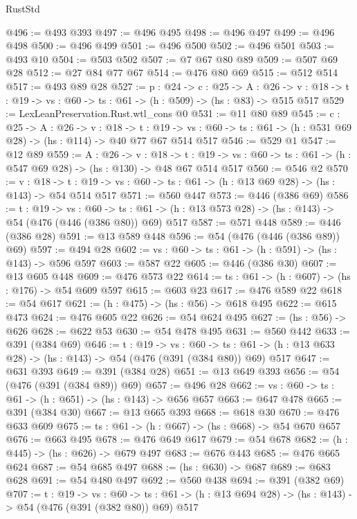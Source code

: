\begin{lexlean}{RustStd}
\begin{coremodule}
@496 := @493 @393
@497 := @496 @495
@498 := @496 @497
@499 := @496 @498
@500 := @496 @499
@501 := @496 @500
@502 := @496 @501
@503 := @493 @10
@504 := @503 @502
@507 := @7 @67 @80 @89
@509 := @507 @69 @28
@512 := @27 @84 @77 @67
@514 := @476 @80 @69
@515 := @512 @514
@517 := @493 @89 @28
@527 := {p : @24} ->
  {c : @25} ->
  {A : @26} ->
  {v : @18} -> {t : @19} -> {vs : @60} -> {ts : @61} -> (h : @509) -> (hs : @83) -> @515 @517
@529 := LexLeanPreservation.Rust.wtl_cons @0
@531 := @11 @80 @89
@545 := {c : @25} ->
  {A : @26} ->
  {v : @18} ->
  {t : @19} ->
  {vs : @60} -> {ts : @61} -> (h : @531 @69 @28) -> (hs : @114) -> @40 @77 @67 @514 @517
@546 := @529 @1
@547 := @12 @89
@559 := {A : @26} ->
  {v : @18} ->
  {t : @19} -> {vs : @60} -> {ts : @61} -> (h : @547 @69 @28) -> (hs : @130) -> @48 @67 @514 @517
@560 := @546 @2
@570 := {v : @18} ->
  {t : @19} -> {vs : @60} -> {ts : @61} -> (h : @13 @69 @28) -> (hs : @143) -> @54 @514 @517
@571 := @560 @447
@573 := @446 (@386 @69)
@586 := {t : @19} ->
  {vs : @60} ->
  {ts : @61} -> (h : @13 @573 @28) -> (hs : @143) -> @54 (@476 (@446 (@386 @80)) @69) @517
@587 := @571 @448
@589 := @446 (@386 @28)
@591 := @13 @589 @448
@596 := @54 (@476 (@446 (@386 @89)) @69)
@597 := @494 @28
@602 := {vs : @60} -> {ts : @61} -> (h : @591) -> (hs : @143) -> @596 @597
@603 := @587 @22
@605 := @446 (@386 @30)
@607 := @13 @605 @448
@609 := @476 @573 @22
@614 := {ts : @61} -> (h : @607) -> (hs : @176) -> @54 @609 @597
@615 := @603 @23
@617 := @476 @589 @22
@618 := @54 @617
@621 := (h : @475) -> (hs : @56) -> @618 @495
@622 := @615 @473
@624 := @476 @605 @22
@626 := @54 @624 @495
@627 := (hs : @56) -> @626
@628 := @622 @53
@630 := @54 @478 @495
@631 := @560 @442
@633 := @391 (@384 @69)
@646 := {t : @19} ->
  {vs : @60} ->
  {ts : @61} -> (h : @13 @633 @28) -> (hs : @143) -> @54 (@476 (@391 (@384 @80)) @69) @517
@647 := @631 @393
@649 := @391 (@384 @28)
@651 := @13 @649 @393
@656 := @54 (@476 (@391 (@384 @89)) @69)
@657 := @496 @28
@662 := {vs : @60} -> {ts : @61} -> (h : @651) -> (hs : @143) -> @656 @657
@663 := @647 @478
@665 := @391 (@384 @30)
@667 := @13 @665 @393
@668 := @618 @30
@670 := @476 @633 @609
@675 := {ts : @61} -> (h : @667) -> (hs : @668) -> @54 @670 @657
@676 := @663 @495
@678 := @476 @649 @617
@679 := @54 @678
@682 := (h : @445) -> (hs : @626) -> @679 @497
@683 := @676 @443
@685 := @476 @665 @624
@687 := @54 @685 @497
@688 := (hs : @630) -> @687
@689 := @683 @628
@691 := @54 @480 @497
@692 := @560 @438
@694 := @391 (@382 @69)
@707 := {t : @19} ->
  {vs : @60} ->
  {ts : @61} -> (h : @13 @694 @28) -> (hs : @143) -> @54 (@476 (@391 (@382 @80)) @69) @517

\end{coremodule}
\end{lexlean}
